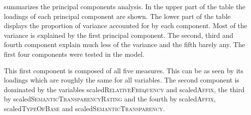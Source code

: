  summarizes the principal components analysis. In the upper part of the table the loadings of each principal component are shown. The lower part of the table displays the proportion of variance accounted for by each component. 
Most of the variance is explained by the first principal component. The second, third and fourth component explain much less of the variance and the fifth barely any.  The first four components were tested in the model. 


\begin{table}
	\caption{ Summary of principal components}
	\label{tbl: summary PC im exp}

	
			\vspace*{-0.5cm}
	
\end{table}



This first component is composed of all five measures. This can be as seen by its loadings which are roughly the same for all variables. The second component is dominated by the variables scaled\textsc{RelativeFrequency} and scaled\textsc{Affix}, the third by scaled\textsc{SemanticTransparencyRating} and the fourth by scaled\textsc{Affix}, scaled\textsc{TypeOfBase} and scaled\textsc{SemanticTransparency}. 


